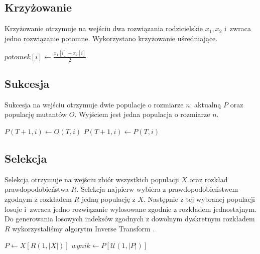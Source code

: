 \documentclass[12pt, a4paper]{article}
\begin{document}
\subsection{Krzyżowanie}

Krzyżowanie otrzymuje na wejściu dwa rozwiązania rodzicielskie $x_1,x_2$ i~zwraca jedno rozwiązanie potomne. 
Wykorzystano krzyżowanie uśredniające.

\begin{algorithm}[H]
\begin{algorithmic}[1]
    \State $potomek[i] \gets \frac{x_1[i] + x_2[i]}{2}$
  \EndFor
\EndFunction
\end{algorithmic}
\end{algorithm}

\subsection{Sukcesja}

Sukcesja na wejściu otrzymuje dwie populacje o rozmiarze $n$: aktualną $P$ oraz populację mutantów $O$.
Wyjściem jest jedna populacja o rozmiarze $n$.

\begin{algorithm}[H]
\begin{algorithmic}[1]
      \State $P(T+1, i) \gets O(T, i)$
    \Else
      \State $P(T+1, i) \gets P(T, i)$
    \EndIf
  \EndFor
\EndFunction
\end{algorithmic}
\end{algorithm}

\subsection{Selekcja}

Selekcja otrzymuje na wejściu zbiór wszystkich populacji $X$ oraz rozkład prawdopodobieństwa $R$.
Selekcja najpierw wybiera z prawdopodobieństwem zgodnym z rozkładem $R$ jedną populację z $X$. 
Następnie z tej wybranej populacji losuje i~zwraca jedno rozwiązanie wylosowane zgodnie z rozkładem jednostajnym.
Do generowania losowych indeksów zgodnych z dowolnym dyskretnym rozkładem $R$ wykorzystaliśmy algorytm Inverse Transform \cite{norm}.

\begin{algorithm}[H]
\begin{algorithmic}[1]
  \State $P \gets X[R(1, |X|)]$
  \State $wynik \gets P[\mathcal{U}(1, |P|)]$
\EndFunction
\end{algorithmic}
\end{algorithm}
\end{document}

